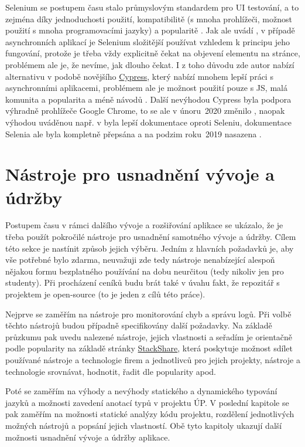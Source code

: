 Selenium se postupem času stalo průmyslovým standardem pro UI testování, a to zejména díky jednoduchosti použití, kompatibilitě (s mnoha prohlížeči, možnost použití s mnoha programovacími jazyky) a popularitě \cite{test-selenium1}. Jak ale uvádí \cite{test-cypress1}, v případě asynchronních aplikací je Selenium složitější používat vzhledem k principu jeho fungování, protože je třeba vždy explicitně čekat na objevení elementu na stránce, problémem ale je, že nevíme, jak dlouho čekat. I z toho důvodu zde autor nabízí alternativu v podobě novějšího \href{https://www.cypress.io/}{Cypress}, který nabízí mnohem lepší práci s asynchronními aplikacemi, problémem ale je možnost použití pouze s JS, malá komunita a popularita a méně návodů \cite{test-cypress1}. Další nevýhodou Cypress byla podpora výhradně prohlížeče Google Chrome, to se ale v únoru~2020 změnilo \cite{test-cypress2}, naopak výhodou uváděnou např. v \cite{test-cypress3} byla lepší dokumentace oproti Seleniu, dokumentace Selenia ale byla kompletně přepsána a na podzim roku~2019 nasazena \cite{test-selenium2}.

\chapter{Nástroje pro usnadnění vývoje a údržby}\label{chap:nastrojeprousnadnenivyvojeaudrzby}

Postupem času v rámci dalšího vývoje a rozšiřování aplikace se ukázalo, že je třeba použít pokročilé nástroje pro usnadnění samotného vývoje a údržby. Cílem této sekce je nastínit způsob jejich výběru. Jedním z hlavních požadavků je, aby vše potřebné bylo zdarma, neuvažuji zde tedy nástroje nenabízející alespoň nějakou formu bezplatného používání na dobu neurčitou (tedy nikoliv jen pro studenty). Při procházení ceníků budu brát také v úvahu fakt, že repozitář s projektem je open-source (to je jeden z cílů této práce). 

Nejprve se zaměřím na nástroje pro monitorování chyb a správu logů. Při volbě těchto nástrojů budou případně specifikovány další požadavky. Na základě průzkumu pak uvedu nalezené nástroje, jejich vlastnosti a seřadím je orientačně podle popularity na základě stránky \href{https://stackshare.io/}{StackShare}, která poskytuje \cite{stackshare} možnost sdílet používané nástroje a technologie firem a jednotlivců pro jejich projekty, nástroje a technologie srovnávat, hodnotit, řadit dle popularity apod.

Poté se zaměřím na výhody a nevýhody statického a dynamického typování jazyků a možnosti zavedení anotací typů v projektu ÚP. V poslední kapitole se pak zaměřím na možnosti statické analýzy kódu projektu, rozdělení jednotlivých možných nástrojů a popsání jejich vlastností. Obě tyto kapitoly ukazují další možnosti usnadnění vývoje a údržby aplikace.

